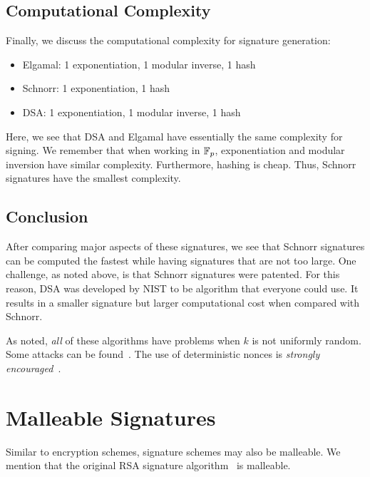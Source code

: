 \subsection{Computational Complexity}

Finally, we discuss the computational complexity for signature generation:

\begin{itemize}
    \item Elgamal: 1 exponentiation, 1 modular inverse, 1 hash
    \item Schnorr: 1 exponentiation, 1 hash
    \item DSA: 1 exponentiation, 1 modular inverse, 1 hash
\end{itemize}

\noindent
Here, we see that DSA and Elgamal have essentially the same complexity
for signing.
We remember that when working in $\mathbb{F}_{p}$, exponentiation
and modular inversion have similar complexity.
Furthermore, hashing is cheap.
Thus, Schnorr signatures have the smallest complexity.

\subsection{Conclusion}

After comparing major aspects of these \glspl{signature},
we see that Schnorr signatures can be computed the fastest
while having signatures that are not too large.
One challenge, as noted above, is that Schnorr signatures
were patented.
For this reason, DSA was developed by NIST to be algorithm
that everyone could use.
It results in a smaller signature but larger computational
cost when compared with Schnorr.

As noted, \emph{all} of these algorithms have problems when
$k$ is not uniformly random.
Some attacks can be found~\cite{cryptoeprint:2019:023,PartialNonces2002}.
The use of deterministic \glspl{nonce} is
\emph{strongly encouraged}~\cite{rfc6979}.



\section{Malleable Signatures}

Similar to \glspl{encryption scheme}, \gls{signature} schemes may also
be malleable.
We mention that the original RSA signature algorithm~\cite{RSApaper}
is malleable.
